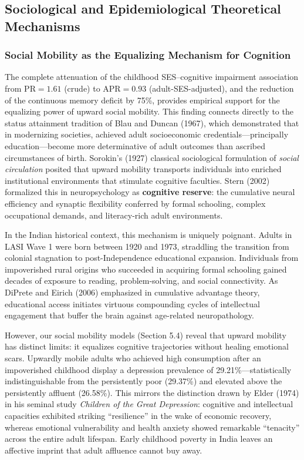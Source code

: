 \subsection{Sociological and Epidemiological Theoretical Mechanisms}

\subsubsection{Social Mobility as the Equalizing Mechanism for Cognition}
The complete attenuation of the childhood SES–cognitive impairment association from $\text{PR} = 1.61$ (crude) to $\text{APR} = 0.93$ (adult-SES-adjusted), and the reduction of the continuous memory deficit by 75\%, provides empirical support for the equalizing power of upward social mobility. This finding connects directly to the status attainment tradition of Blau and Duncan (1967), which demonstrated that in modernizing societies, achieved adult socioeconomic credentials—principally education—become more determinative of adult outcomes than ascribed circumstances of birth. Sorokin's (1927) classical sociological formulation of \textit{social circulation} posited that upward mobility transports individuals into enriched institutional environments that stimulate cognitive faculties. Stern (2002) formalized this in neuropsychology as \textbf{cognitive reserve}: the cumulative neural efficiency and synaptic flexibility conferred by formal schooling, complex occupational demands, and literacy-rich adult environments.

In the Indian historical context, this mechanism is uniquely poignant. Adults in LASI Wave 1 were born between 1920 and 1973, straddling the transition from colonial stagnation to post-Independence educational expansion. Individuals from impoverished rural origins who succeeded in acquiring formal schooling gained decades of exposure to reading, problem-solving, and social connectivity. As DiPrete and Eirich (2006) emphasized in cumulative advantage theory, educational access initiates virtuous compounding cycles of intellectual engagement that buffer the brain against age-related neuropathology.

However, our social mobility models (Section 5.4) reveal that upward mobility has distinct limits: it equalizes cognitive trajectories without healing emotional scars. Upwardly mobile adults who achieved high consumption after an impoverished childhood display a depression prevalence of 29.21\%—statistically indistinguishable from the persistently poor (29.37\%) and elevated above the persistently affluent (26.58\%). This mirrors the distinction drawn by Elder (1974) in his seminal study \textit{Children of the Great Depression}: cognitive and intellectual capacities exhibited striking ``resilience'' in the wake of economic recovery, whereas emotional vulnerability and health anxiety showed remarkable ``tenacity'' across the entire adult lifespan. Early childhood poverty in India leaves an affective imprint that adult affluence cannot buy away.

